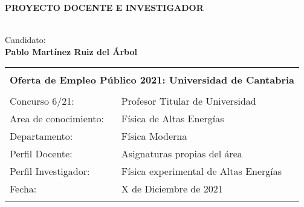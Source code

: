\thispagestyle{empty}
\newpage
\begin{center}
\baselineskip=1cm {\centerline \bf \huge
\textbf{PROYECTO DOCENTE E INVESTIGADOR}} \vspace*{2.5cm}\\

\vspace*{2.0cm} \baselineskip=0.5cm
{\Large Candidato:}\\
\vspace*{0.25cm}
{\Large \bf \sc \textbf{Pablo Martínez Ruiz del Árbol}}\\
\vspace*{0.15cm}
\vspace*{2.0cm} \baselineskip=0.75cm
\end{center}


\begin{center}
\begin{tabularx}{\textwidth}{||X X||}
\hline\hline
\multicolumn{2}{||c||}{} \\
\multicolumn{2}{||c||}{\large \textbf{Oferta de Empleo Público 2021: Universidad de Cantabria}} \\
& \\
Concurso 6/21: & Profesor Titular de Universidad \\
Area de conocimiento: & {Física de Altas Energías} \\
Departamento: & {Física Moderna} \\
Perfil Docente: & {Asignaturas propias del área} \\ 
Perfil Investigador: & {Física experimental de Altas Energías} \\
Fecha: & X de Diciembre de 2021 \\
& \\
\hline\hline
\end{tabularx}
\end{center}

\normalsize